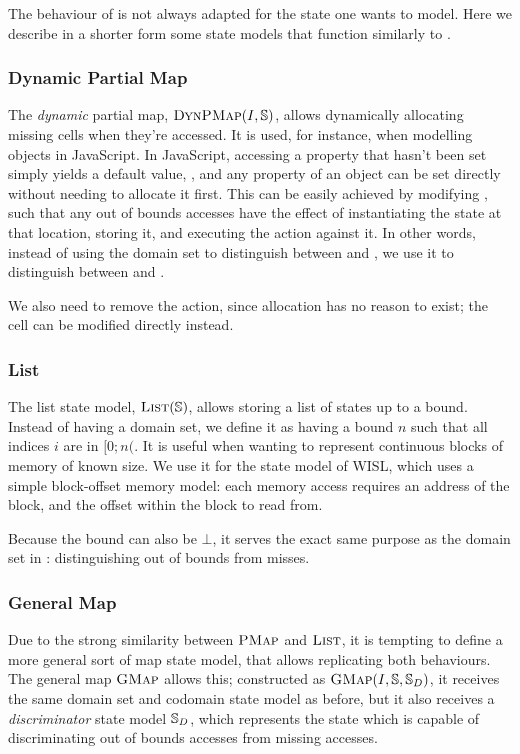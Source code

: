 The behaviour of \PMap{} is not always adapted for the state one wants to model. Here we describe in a shorter form some state models that function similarly to \PMap.

\subsubsection{Dynamic Partial Map}

The \emph{dynamic} partial map, $\textsc{DynPMap}(I,\mathbb S)$, allows dynamically allocating missing cells when they're accessed. It is used, for instance, when modelling objects in JavaScript. In JavaScript, accessing a property that hasn't been set simply yields a default value, , and any property of an object can be set directly without needing to allocate it first. This can be easily achieved by modifying \PMap, such that any out of bounds accesses have the effect of instantiating the state at that location, storing it, and executing the action against it. In other words, instead of using the domain set to distinguish between \Err{} and \Miss, we use it to distinguish between \Ok{} and \Miss \cite{sacha-phd}.

We also need to remove the \alloc{} action, since allocation has no reason to exist; the cell can be modified directly instead.

\subsubsection{List}

The list state model, $\textsc{List}(\mathbb S)$, allows storing a list of states up to a bound. Instead of having a domain set, we define it as having a bound $n$ such that all indices $i$ are in $[0;n($. It is useful when wanting to represent continuous blocks of memory of known size. We use it for the state model of WISL, which uses a simple block-offset memory model: each memory access requires an address of the block, and the offset within the block to read from.

Because the bound can also be $\bot$, it serves the exact same purpose as the domain set in \PMap{}: distinguishing out of bounds from misses.

\subsubsection{General Map}

Due to the strong similarity between $\textsc{PMap}$ and $\textsc{List}$, it is tempting to define a more general sort of map state model, that allows replicating both behaviours. The general map $\textsc{GMap}$ allows this; constructed as $\textsc{GMap}(I,\mathbb S,\mathbb S_D)$, it receives the same domain set and codomain state model as before, but it also receives a \emph{discriminator} state model $\mathbb S_D$, which represents the state which is capable of discriminating out of bounds accesses from missing accesses.

